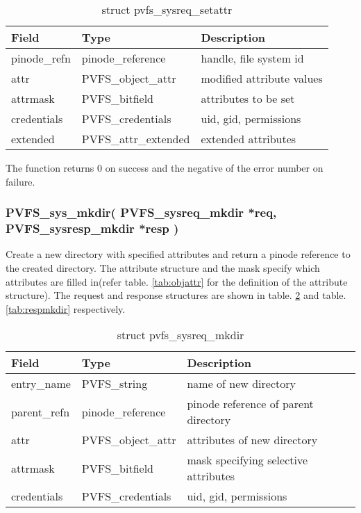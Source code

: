 \documentclass[11pt, letterpaper]{article}
\begin{document}
\begin{table}[H]
\begin{tabular}{|l|l|l|}
\hline
Field & Type & Description \\
\hline
\hline
pinode\_refn & pinode\_reference & handle, file system id \\
\hline
attr & PVFS\_object\_attr & modified attribute values \\
\hline
attrmask & PVFS\_bitfield & attributes to be set  \\
\hline
credentials & PVFS\_credentials & uid, gid, permissions \\
\hline
extended & PVFS\_attr\_extended & extended attributes \\
\hline
\end{tabular}
\caption{struct pvfs\_sysreq\_setattr}\label{tab:reqsattr}
\end{table}

The function returns 0 on success and the negative of the error
number on failure.

\subsubsection{PVFS\_sys\_mkdir(
PVFS\_sysreq\_mkdir *req,
PVFS\_sysresp\_mkdir *resp
)}

Create a new directory with specified attributes and return a pinode
reference to the created directory. The attribute structure and the mask
specify which attributes are filled in(refer table. \ref{tab:objattr} for
the definition of the attribute structure). The request and response
structures are shown in table. \ref{tab:reqmkdir} and table.
\ref{tab:respmkdir} respectively.

\begin{table}[H]
\begin{tabular}{|l|l|l|}
\hline
Field & Type & Description \\
\hline
\hline
entry\_name & PVFS\_string &  name of new directory \\
\hline
parent\_refn & pinode\_reference & pinode reference of parent directory \\ 
\hline
attr & PVFS\_object\_attr & attributes of new directory \\
\hline
attrmask & PVFS\_bitfield & mask specifying selective attributes \\
\hline
credentials & PVFS\_credentials & uid, gid, permissions \\
\hline
\end{tabular}
\caption{struct pvfs\_sysreq\_mkdir}\label{tab:reqmkdir}
\end{table}
\end{document}

